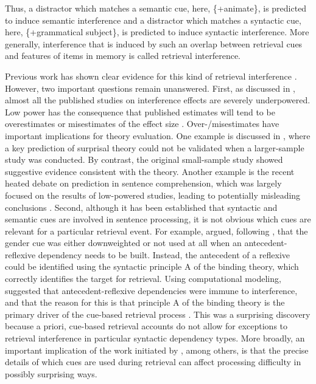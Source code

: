 \documentclass[a4paper, man, floatsintext]{apa7}
\begin{document}
Thus, a distractor which matches a semantic cue, here, \{+animate\}, is predicted to induce semantic interference and a distractor which matches a syntactic cue, here, \{+grammatical subject\}, is predicted to induce syntactic interference. More generally, interference that is induced by such an overlap between retrieval cues and features of items in memory is called retrieval interference. 

Previous work has shown clear evidence for this kind of retrieval interference \parencite{vandyke07, vandyke_mcelree06, vandyke_mcelree2011, nicenboim,  vandyke_lewis03,jaeger_etal_2017}.
However, two important questions remain unanswered. First, as discussed in \textcite{jaeger_etal_2017}, almost all the published studies on interference effects are severely underpowered. Low power has the consequence that published estimates will tend to be overestimates or misestimates of the effect size \parencite{vasishth2018_signficancefilter}. Over-/misestimates have important implications for theory evaluation. One example is discussed in \textcite{vasishth2018_signficancefilter}, where a key prediction of surprisal theory \parencite{levy&keller_2013} could not be validated when a larger-sample study was conducted. By contrast, the original small-sample study \parencite{levy&keller_2013} showed suggestive evidence consistent with the theory. Another example is the recent heated debate on prediction in sentence comprehension, which was largely focused on the results of low-powered studies, leading to potentially misleading conclusions \parencite{nicenboim_etal_2020}.
Second, although it has been established \parencite[e.g.,][]{vandyke07,mertzen} that syntactic and semantic cues are involved in sentence processing, it is not obvious which cues are relevant for a particular retrieval event. For example, \textcite{dillon2013} argued, following \textcite{Sturt2003}, that the gender cue was either downweighted or not used at all when an antecedent-reflexive dependency needs to be built. Instead, the antecedent of a reflexive could be identified using the syntactic principle A of the binding theory, which correctly identifies the target for retrieval.  Using computational modeling, \textcite{dillon2013} suggested that antecedent-reflexive dependencies were immune to interference, and that the reason for this is that principle A of the binding theory is the primary driver of the cue-based retrieval process \parencite[cf. ][]{jaeger_etal_2020,yadav2021individual}. This was a surprising discovery because a priori, cue-based retrieval accounts do not allow for exceptions to retrieval interference in particular syntactic dependency types.
More broadly, an important implication of the work initiated by \textcite{dillon2013}, among others, is that  the precise details of which cues are used during retrieval can affect processing difficulty in possibly surprising ways.
\end{document}
